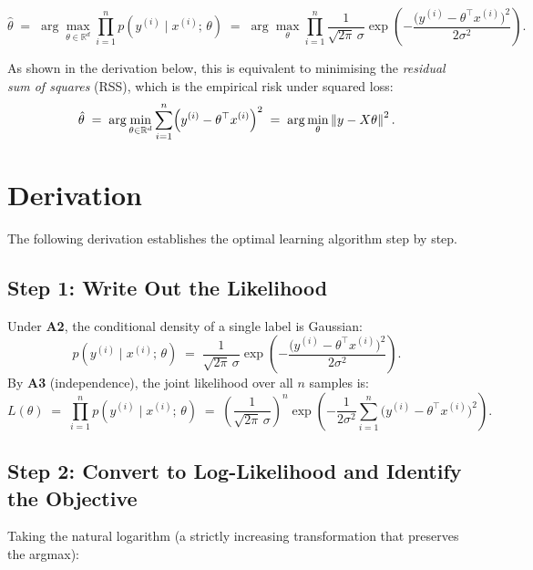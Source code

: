 \documentclass[11pt]{article}
\theoremstyle{definition}
\theoremstyle{remark}
\newcommand{\R}{\mathbb{R}}
\newcommand{\norm}[1]{\left\lVert#1\right\rVert}
\newcommand{\T}{^{\top}}
\begin{document}
\[
    \hat{\theta}
    \;=\;
    \arg\max_{\theta \in \R^{d}}
    \prod_{i=1}^{n} p\!\left(y^{(i)} \mid x^{(i)};\,\theta\right)
    \;=\;
    \arg\max_{\theta}
    \prod_{i=1}^{n}
    \frac{1}{\sqrt{2\pi}\,\sigma}
    \exp\!\left(-\frac{\bigl(y^{(i)} - \theta\T x^{(i)}\bigr)^{2}}{2\sigma^{2}}\right).
\]

As shown in the derivation below, this is equivalent to minimising the
\emph{residual sum of squares} (RSS), which is the empirical risk under
squared loss:
\[
    \hat{\theta}
    \;=\;
    \arg\min_{\theta \in \R^{d}}
    \sum_{i=1}^{n}
    \Bigl(y^{(i)} - \theta\T x^{(i)}\Bigr)^{2}
    \;=\;
    \arg\min_{\theta}
    \norm{y - X\theta}^{2}.
\]

\section{Derivation}

The following derivation establishes the optimal learning algorithm step by step.

\subsection{Step 1: Write Out the Likelihood}

Under \textbf{A2}, the conditional density of a single label is Gaussian:
\[
    p\!\left(y^{(i)} \mid x^{(i)};\,\theta\right)
    \;=\;
    \frac{1}{\sqrt{2\pi}\,\sigma}
    \exp\!\left(-\frac{\bigl(y^{(i)} - \theta\T x^{(i)}\bigr)^{2}}{2\sigma^{2}}\right).
\]
By \textbf{A3} (independence), the joint likelihood over all $n$ samples is:
\[
    L(\theta)
    \;=\;
    \prod_{i=1}^{n} p\!\left(y^{(i)} \mid x^{(i)};\,\theta\right)
    \;=\;
    \left(\frac{1}{\sqrt{2\pi}\,\sigma}\right)^{\!n}
    \exp\!\left(-\frac{1}{2\sigma^{2}}
        \sum_{i=1}^{n}\bigl(y^{(i)} - \theta\T x^{(i)}\bigr)^{2}
    \right).
\]

\subsection{Step 2: Convert to Log-Likelihood and Identify the Objective}

Taking the natural logarithm (a strictly increasing transformation that
preserves the argmax):
\end{document}
